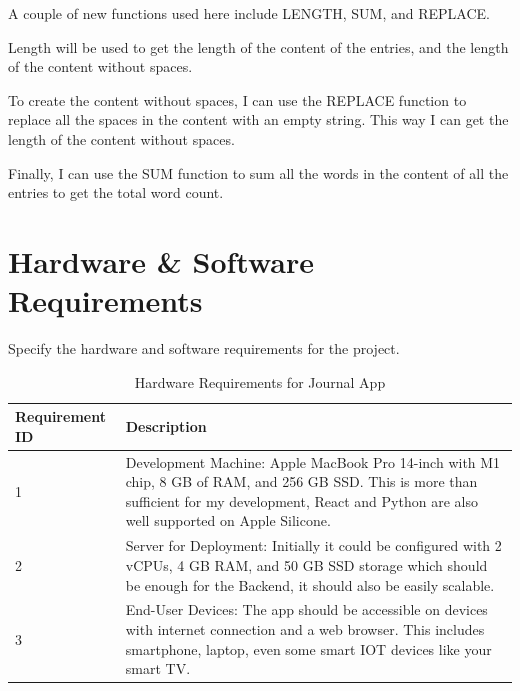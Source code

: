 A couple of new functions used here include LENGTH, SUM, and REPLACE.

Length will be used to get the length of the content of the entries, and the length of the content without spaces.

To create the content without spaces, I can use the REPLACE function to replace all the spaces in the content with an empty string. This way I can get the length of the content without spaces.

Finally, I can use the SUM function to sum all the words in the content of all the entries to get the total word count.








\section{Hardware \& Software Requirements}
Specify the hardware and software requirements for the project.

\begin{table}[H]
    \centering
    \begin{tabular}{|l|p{10cm}|}
    \hline
    \textbf{Requirement ID} & \textbf{Description} \\ \hline
    1 & Development Machine: Apple MacBook Pro 14-inch with M1 chip, 8 GB of RAM, and 256 GB SSD. This is more than sufficient for my development, React and Python are also well supported on Apple Silicone. \\ \hline
    2 & Server for Deployment: Initially it could be configured with 2 vCPUs, 4 GB RAM, and 50 GB SSD storage which should be enough for the Backend, it should also be easily scalable. \\ \hline
    3 & End-User Devices: The app should be accessible on devices with internet connection and a web browser. This includes smartphone, laptop, even some smart IOT devices like your smart TV. \\ \hline
    \end{tabular}
    \caption{Hardware Requirements for Journal App}
    \end{table}

